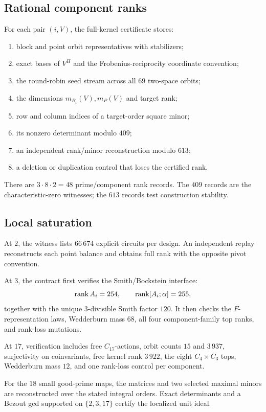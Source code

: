\subsection{Rational component ranks}

For each pair \((i,V)\), the full-kernel certificate stores:
\begin{enumerate}
  \item block and point orbit representatives with stabilizers;
  \item exact bases of \(V^H\) and the Frobenius-reciprocity coordinate
  convention;
  \item the round-robin seed stream across all \(69\) two-space orbits;
  \item the dimensions \(m_{B_i}(V),m_P(V)\) and target rank;
  \item row and column indices of a target-order square minor;
  \item its nonzero determinant modulo \(409\);
  \item an independent rank/minor reconstruction modulo \(613\);
  \item a deletion or duplication control that loses the certified rank.
\end{enumerate}
There are \(3\cdot8\cdot2=48\) prime/component rank records.  The
\(409\) records are the characteristic-zero witnesses; the \(613\)
records test construction stability.

\subsection{Local saturation}

At \(2\), the witness lists \(66\,674\) explicit circuits per design.
An independent replay reconstructs each point balance and obtains full
rank with the opposite pivot convention.

At \(3\), the contract first verifies the Smith/Bockstein interface:
\[
\operatorname{rank} A_i=254,\qquad
\operatorname{rank}[A_i;\alpha]=255,
\]
together with the unique \(3\)-divisible Smith factor \(120\).  It then
checks the \(F\)-representation laws, Wedderburn mass \(68\), all four
component-family top ranks, and rank-loss mutations.

At \(17\), verification includes free \(C_{17}\)-actions, orbit counts
\(15\) and \(3\,937\), surjectivity on coinvariants, free kernel rank
\(3\,922\), the eight \(C_4\times C_3\) tops, Wedderburn mass \(12\),
and one rank-loss control per component.

For the \(18\) small good-prime maps, the matrices and two selected maximal
minors are reconstructed over the stated integral orders.  Exact
determinants and a Bezout gcd supported on \(\{2,3,17\}\) certify the
localized unit ideal.


